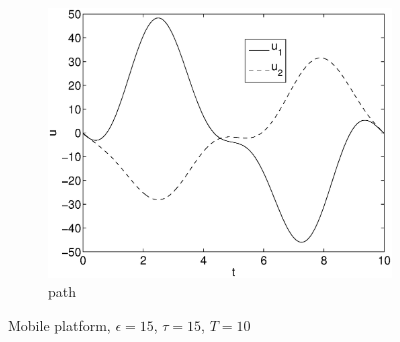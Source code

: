 \begin{figure}[h]
\begin{subfigure}[b]{\textwidth}
\centering
\includegraphics[height=0.3\textheight]{img/final_15_15_10_u.eps}
\caption{path}
\end{subfigure}
\caption{Mobile platform, $\epsilon=15$, $\tau=15$, $T=10$}
\label{fig:pl3}
\end{figure}

